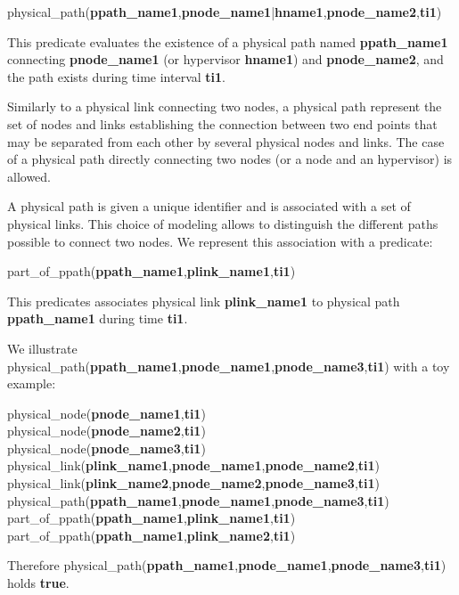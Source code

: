 physical\_path(\textbf{ppath\_name1},\textbf{pnode\_name1}|\textbf{hname1},\textbf{pnode\_name2},\textbf{ti1})

This predicate evaluates the existence of a physical path named \textbf{ppath\_name1} connecting \textbf{pnode\_name1} (or hypervisor \textbf{hname1}) and \textbf{pnode\_name2}, and the path exists during time interval \textbf{ti1}. 

Similarly to a physical link connecting two nodes, a physical path represent the set of nodes and links establishing the connection between two end points that may be separated from each other by several physical nodes and links.
The case of a physical path directly connecting two nodes (or a node and an hypervisor) is allowed.

A physical path is given a unique identifier and is associated with a set of physical links. 
This choice of modeling allows to distinguish the different paths possible to connect two nodes. 
We represent this association with a predicate:

part\_of\_ppath(\textbf{ppath\_name1},\textbf{plink\_name1},\textbf{ti1})

This predicates associates physical link \textbf{plink\_name1} to physical path \textbf{ppath\_name1} during time \textbf{ti1}.

We illustrate physical\_path(\textbf{ppath\_name1},\textbf{pnode\_name1},\textbf{pnode\_name3},\textbf{ti1}) with a toy example:

physical\_node(\textbf{pnode\_name1},\textbf{ti1})\\
physical\_node(\textbf{pnode\_name2},\textbf{ti1})\\
physical\_node(\textbf{pnode\_name3},\textbf{ti1})\\
physical\_link(\textbf{plink\_name1},\textbf{pnode\_name1},\textbf{pnode\_name2},\textbf{ti1})\\
physical\_link(\textbf{plink\_name2},\textbf{pnode\_name2},\textbf{pnode\_name3},\textbf{ti1})\\
physical\_path(\textbf{ppath\_name1},\textbf{pnode\_name1},\textbf{pnode\_name3},\textbf{ti1})\\
part\_of\_ppath(\textbf{ppath\_name1},\textbf{plink\_name1},\textbf{ti1})\\
part\_of\_ppath(\textbf{ppath\_name1},\textbf{plink\_name2},\textbf{ti1})

Therefore physical\_path(\textbf{ppath\_name1},\textbf{pnode\_name1},\textbf{pnode\_name3},\textbf{ti1}) holds \textbf{true}.

